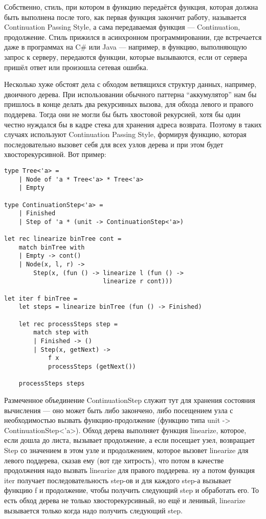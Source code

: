 \documentclass[a5paper]{article}
\begin{document}
Собственно, стиль, при котором в функцию передаётся функция, которая должна быть выполнена после того, как первая функция закончит работу, называется Continuation Passing Style, а сама передаваемая функция --- Continuation, продолжение. Стиль прижился в асинхронном программировании, где встречается даже в программах на C\# или Java --- например, в функцию, выполняющую запрос к серверу, передаются функции, которые вызываются, если от сервера пришёл ответ или произошла сетевая ошибка.

Несколько хуже обстоят дела с обходом ветвящихся структур данных, например, двоичного дерева. При использовании обычного паттерна ``аккумулятор'' нам бы пришлось в конце делать два рекурсивных вызова, для обхода левого и правого поддерева. Тогда они не могли бы быть хвостовой рекурсией, хотя бы один честно нуждался бы в кадре стека для хранения адреса возврата. Поэтому в таких случаях используют Continuation Passing Style, формируя функцию, которая последовательно вызовет себя для всех узлов дерева и при этом будет хвосторекурсивной. Вот пример:

\begin{verbatim}
type Tree<'a> =
    | Node of 'a * Tree<'a> * Tree<'a>
    | Empty

type ContinuationStep<'a> =
    | Finished
    | Step of 'a * (unit -> ContinuationStep<'a>)

let rec linearize binTree cont =
    match binTree with
    | Empty -> cont()
    | Node(x, l, r) ->
        Step(x, (fun () -> linearize l (fun () -> 
                           linearize r cont)))

let iter f binTree =
    let steps = linearize binTree (fun () -> Finished)

    let rec processSteps step =
        match step with
        | Finished -> ()
        | Step(x, getNext) -> 
            f x
            processSteps (getNext())
    
    processSteps steps
\end{verbatim}

Размеченное объединение ContinuationStep служит тут для хранения состояния вычисления --- оно может быть либо закончено, либо посещением узла с необходимостью вызвать функцию-продолжение (функцию типа unit -> ContinuationStep<'a>). Обход дерева выполняет функция linearize, которое, если дошла до листа, вызывает продолжение, а если посещает узел, возвращает Step со значением в этом узле и продолжением, которое вызовет linearize для левого поддерева, сказав ему (вот где хитрость), что потом в качестве продолжения надо вызвать linearize для правого поддерева. ну а потом функция iter получает последовательность step-ов и для каждого step-а вызывает функцию f и продолжение, чтобы получить следующий step и обработать его. То есть обход дерева не только хвосторекурсивный, но ещё и ленивый, linearize вызывается только когда надо получить следующий step.
\end{document}
